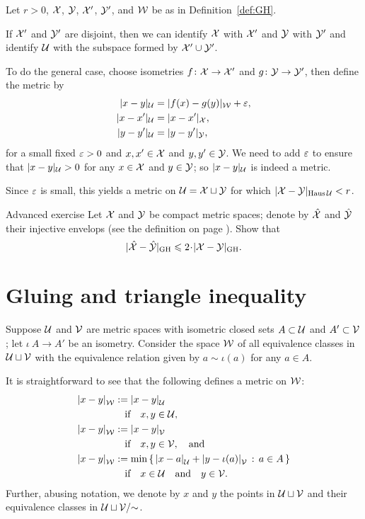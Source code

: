 Let $r>0$, $\mathcal{X}$, $\mathcal{Y}$, $\mathcal{X}'$, $\mathcal{Y}'$, and $\mathcal{W}$ be as in Definition~\ref{def:GH}.

If  $\mathcal{X}'$ and $\mathcal{Y}'$ are disjoint, then we can identify $\mathcal{X}$ with  $\mathcal{X}'$ and $\mathcal{Y}$ with $\mathcal{Y}'$ and identify $\mathcal{U}$ with the subspace formed by $\mathcal{X}'\cup\mathcal{Y}'$.

To do the general case,
choose isometries $f\colon \mathcal{X} \to \mathcal{X}'$ and
$g\: \spc{Y} \z\to \spc{Y}'$, then define the metric by
\begin{align*}
|x-y|_{\spc{U}} &= |f (x)\z- g(y)|_{\spc{W}}+\eps,
\\
|x-x'|_{\spc{U}} &= |x- x'|_{\spc{X}},
\\
|y-y'|_{\spc{U}} &= |y- y'|_{\spc{Y}},
\end{align*}
for a small fixed $\varepsilon>0$ and $x,x' \in \mathcal{X}$ and $y,y' \in \mathcal{Y}$.
We need to add $\varepsilon$ to ensure that $|x-y|_{\mathcal{U}} > 0$ for any $x\in \mathcal{X}$ and $y\in \mathcal{Y}$;
so $|x-y|_{\mathcal{U}}$ is indeed a metric.

Since $\varepsilon$ is small,
this yields a metric on $\mathcal{U}=\mathcal{X}\sqcup \mathcal{Y}$ for which
$|\spc{X}- \spc{Y}|_{\Haus\spc{U}} \z< r$.
\qeds

\begin{thm}{Advanced exercise}\label{ex:GH-inj}
Let $\mathcal{X}$ and $\mathcal{Y}$ be compact metric spaces;
denote by $\hat{\mathcal{X}}$ and $\hat{\mathcal{Y}}$ their injective envelops (see the definition on page \pageref{page:InjX}).
Show that 
\[|\hat{\spc{X}}-\hat{\spc{Y}}|_{\GH}\le 2\cdot|\spc{X}- \spc{Y}|_{\GH}.\] 

\end{thm}

\section{Gluing and triangle inequality}\label{sec:gluing+triangle}

Suppose 
$\mathcal{U}$ and $\mathcal{V}$ are metric spaces 
with isometric closed sets $A\subset\mathcal{U}$ and $A'\subset\mathcal{V}$;
let $\iota\:A\to A'$ be an isometry.
Consider the space $\mathcal{W}$ of all equivalence classes in $\mathcal{U}\sqcup\mathcal{V}$ with the equivalence relation given by $a\sim\iota(a)$ for any $a\in A$.

It is straightforward to see that the following defines a metric on $\mathcal{W}$:
\begin{align*}
\dist{x}{y}{\spc{W}}&\df\dist{x}{y}{\spc{U}}
\\
&\quad\text{if}\quad x,y\in \spc{U},
\\
\dist{x}{y}{\spc{W}}&\df\dist{x}{y}{\spc{V}}
\\
&\quad\text{if}\quad x,y\in \spc{V},\quad\text{and}
\\
\dist{x}{y}{\spc{W}}&\df\min\set{\dist{x}{a}{\spc{U}}+\dist{y}{\iota(a)}{\spc{V}}}{a\in A}
\\
&\quad\text{if}\quad x\in \spc{U}\quad\text{and}\quad y\in \spc{V}.
\end{align*}
Further, abusing notation, we denote by $x$ and $y$ the points in $\mathcal{U}\sqcup\mathcal{V}$ and their equivalence classes in $\mathcal{U}\sqcup\mathcal{V}/{{\sim}}$.

